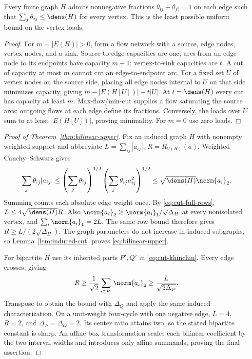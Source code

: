 \begin{lemma}\label{lem:fractional-orientation}
Every finite graph $H$ admits nonnegative fractions
$\theta_{ij}+\theta_{ji}=1$ on each edge such that
$\sum_j\theta_{ij}\le\dens(H)$ for every vertex. This is the least
possible uniform bound on the vertex loads.
\end{lemma}
\begin{proof}
For $m=|E(H)|>0$, form a flow network with a source, edge nodes, vertex
nodes, and a sink. Source-to-edge capacities are one; arcs from an edge
node to its endpoints have capacity $m+1$; vertex-to-sink capacities are
$t$. A cut of capacity at most $m$ cannot cut an edge-to-endpoint arc.
For a fixed set $U$ of vertex nodes on the source side, placing all edge
nodes internal to $U$ on that side minimizes capacity, giving
$m-|E(H[U])|+t|U|$. At $t=\dens(H)$ every cut has capacity at least $m$.
Max-flow/min-cut supplies a flow saturating the source arcs; outgoing flows
at each edge define its fractions. Conversely, the loads over $U$ sum to
at least $|E(H[U])|$, proving minimality. For $m=0$ use zero loads.
\end{proof}

\begin{proof}[Proof of Theorem~\ref{thm:bilinear-upper}]
Fix an induced graph $H$ with nonempty weighted support and abbreviate
$L=\sum_{ij}|a_{ij}|$, $R=R_{V(H)}(a)$. Weighted Cauchy--Schwarz gives
\[
 \sum_j\theta_{ij}|a_{ij}|
 \le\left(\sum_j\theta_{ij}\right)^{1/2}
      \left(\sum_j\theta_{ij}a_{ij}^2\right)^{1/2}
 \le\sqrt{\dens(H)}\norm{a_i}_2.
\]
Summing counts each absolute edge weight once. By
\eqref{eq:cut-full-rows}, $L\le4\sqrt{\dens(H)}R$.
Also $\norm{a_i}_2\ge\norm{a_i}_1/\sqrt{\Delta_H}$ at every nonisolated
vertex, and $\sum_i\norm{a_i}_1=2L$. The same row bound therefore gives
$R\ge L/(2\sqrt{\Delta_H})$. The graph parameters do not increase in
induced subgraphs, so Lemma~\ref{lem:induced-cut} proves
\eqref{eq:bilinear-upper}.

For bipartite $H$ use its inherited parts $P',Q'$ in
\eqref{eq:cut-khinchin}. Every edge crosses, giving
\[
 R\ge\frac1{\sqrt2}\sum_{i\in P'}\norm{a_i}_2
       \ge\frac{L}{\sqrt{2\Delta_P}}.
\]
Transpose to obtain the bound with $\Delta_Q$ and apply the same induced
characterization. On a unit-weight four-cycle with one negative edge,
$L=4$, $R=2$, and $\Delta_P=\Delta_Q=2$. Its center ratio attains two,
so the stated bipartite constant is sharp. An affine box transformation
scales each bilinear coefficient by the two interval widths and introduces
only affine summands, proving the final assertion.
\end{proof}

